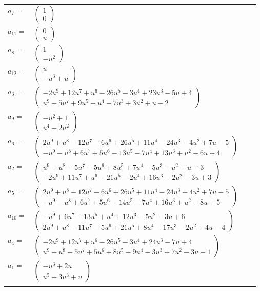 \documentclass[1p]{elsarticle_modified}
\theoremstyle{definition}
\begin{document}
\begin{tabular}{m{7pt} m{180pt} m{7pt} m{180pt} }
\flushright $a_{7}=$&$\begin{pmatrix}1\\0\end{pmatrix}$ \\
\flushright $a_{11}=$&$\begin{pmatrix}0\\u\end{pmatrix}$ \\
\flushright $a_{8}=$&$\begin{pmatrix}1\\- u^2\end{pmatrix}$ \\
\flushright $a_{12}=$&$\begin{pmatrix}u\\- u^3+u\end{pmatrix}$ \\
\flushright $a_{3}=$&$\begin{pmatrix}-2 u^9+12 u^7+u^6-26 u^5-3 u^4+23 u^3-5 u+4\\u^9-5 u^7+9 u^5- u^4-7 u^3+3 u^2+u-2\end{pmatrix}$ \\
\flushright $a_{9}=$&$\begin{pmatrix}- u^2+1\\u^4-2 u^2\end{pmatrix}$ \\
\flushright $a_{6}=$&$\begin{pmatrix}2 u^9+u^8-12 u^7-6 u^6+26 u^5+11 u^4-24 u^3-4 u^2+7 u-5\\- u^9- u^8+6 u^7+5 u^6-13 u^5-7 u^4+13 u^3+u^2-6 u+4\end{pmatrix}$ \\
\flushright $a_{2}=$&$\begin{pmatrix}u^9+u^8-5 u^7-5 u^6+8 u^5+7 u^4-5 u^3- u^2+u-3\\-2 u^9+11 u^7+u^6-21 u^5-2 u^4+16 u^3-2 u^2-3 u+3\end{pmatrix}$ \\
\flushright $a_{5}=$&$\begin{pmatrix}2 u^9+u^8-12 u^7-6 u^6+26 u^5+11 u^4-24 u^3-4 u^2+7 u-5\\- u^9- u^8+6 u^7+5 u^6-14 u^5-7 u^4+16 u^3+u^2-8 u+5\end{pmatrix}$ \\
\flushright $a_{10}=$&$\begin{pmatrix}- u^9+6 u^7-13 u^5+u^4+12 u^3-5 u^2-3 u+6\\2 u^9+u^8-11 u^7-5 u^6+21 u^5+8 u^4-17 u^3-2 u^2+4 u-4\end{pmatrix}$ \\
\flushright $a_{4}=$&$\begin{pmatrix}-2 u^9+12 u^7+u^6-26 u^5-3 u^4+24 u^3-7 u+4\\u^9- u^8-5 u^7+5 u^6+8 u^5-9 u^4-3 u^3+7 u^2-3 u-1\end{pmatrix}$ \\
\flushright $a_{1}=$&$\begin{pmatrix}- u^3+2 u\\u^5-3 u^3+u\end{pmatrix}$\\&\end{tabular}
\end{document}
